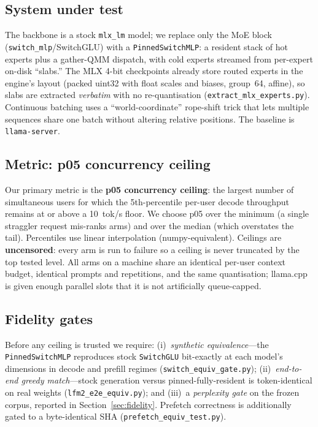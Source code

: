 \documentclass[11pt]{article}
\begin{document}
\subsection{System under test}
The backbone is a stock \texttt{mlx\_lm} model; we replace only the MoE block
(\texttt{switch\_mlp}/SwitchGLU) with a \texttt{PinnedSwitchMLP}: a resident stack of
hot experts plus a gather-QMM dispatch, with cold experts streamed from per-expert
on-disk ``slabs.'' The MLX 4-bit checkpoints already store routed experts in the
engine's layout (packed uint32 with float scales and biases, group~64, affine), so slabs
are extracted \emph{verbatim} with no re-quantisation (\texttt{extract\_mlx\_experts.py}).
Continuous batching uses a ``world-coordinate'' rope-shift trick that lets multiple
sequences share one batch without altering relative positions. The baseline is
\texttt{llama-server}.

\subsection{Metric: p05 concurrency ceiling}
Our primary metric is the \textbf{p05 concurrency ceiling}: the largest number of
simultaneous users for which the 5th-percentile per-user decode throughput remains at or
above a \SI{10}{tok/s} floor. We choose p05 over the minimum (a single straggler request
mis-ranks arms) and over the median (which overstates the tail). Percentiles use linear
interpolation (numpy-equivalent). Ceilings are \textbf{uncensored}: every arm is run to
failure so a ceiling is never truncated by the top tested level. All arms on a machine
share an identical per-user context budget, identical prompts and repetitions, and the
same quantisation; llama.cpp is given enough parallel slots that it is not artificially
queue-capped.

\subsection{Fidelity gates}
Before any ceiling is trusted we require: (i)~\emph{synthetic equivalence}---the
\texttt{PinnedSwitchMLP} reproduces stock \texttt{SwitchGLU} bit-exactly at each model's
dimensions in decode and prefill regimes (\texttt{switch\_equiv\_gate.py}); (ii)~\emph{end-to-end greedy
match}---stock generation versus pinned-fully-resident is token-identical on real weights
(\texttt{lfm2\_e2e\_equiv.py}); and (iii)~a \emph{perplexity gate} on the frozen corpus,
reported in Section~\ref{sec:fidelity}. Prefetch correctness is additionally gated to a
byte-identical SHA (\texttt{prefetch\_equiv\_test.py}).
\end{document}
